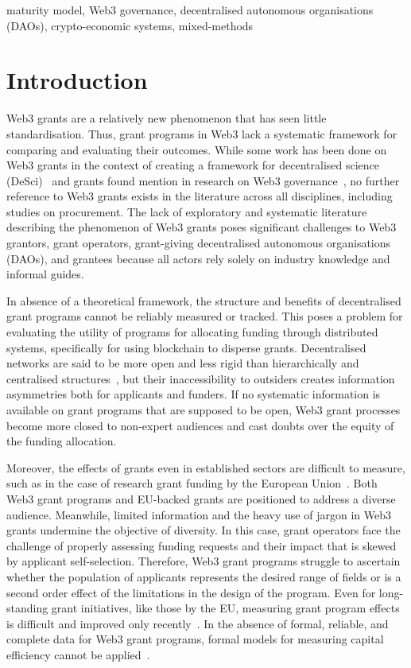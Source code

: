 \documentclass[conference]{IEEEtran}
\begin{document}
\begin{IEEEkeywords}
maturity model, Web3 governance, decentralised autonomous organisations (DAOs), crypto-economic systems, mixed-methods
\end{IEEEkeywords}

\section{Introduction}\label{sec_1}
Web3 grants are a relatively new phenomenon that has seen little standardisation. Thus, grant programs in Web3 lack a systematic framework for comparing and evaluating their outcomes. While some work has been done on Web3 grants in the context of creating a framework for decentralised science (DeSci)~\cite{ding_desci_2022} and grants found mention in research on Web3 governance~\cite{allen_exchange_2022}, no further reference to Web3 grants exists in the literature across all disciplines, including studies on procurement. The lack of exploratory and systematic literature describing the phenomenon of Web3 grants poses significant challenges to Web3 grantors, grant operators, grant-giving decentralised autonomous organisations (DAOs), and grantees because all actors rely solely on industry knowledge and informal guides.

In absence of a theoretical framework, the structure and benefits of decentralised grant programs cannot be reliably measured or tracked. This poses a problem for evaluating the utility of programs for allocating funding through distributed systems, specifically for using blockchain to disperse grants. Decentralised networks are said to be more open and less rigid than hierarchically and centralised structures~\cite{ding_desci_2022}, but their inaccessibility to outsiders creates information asymmetries both for applicants and funders. If no systematic information is available on grant programs that are supposed to be open, Web3 grant processes become more closed to non-expert audiences and cast doubts over the equity of the funding allocation.

Moreover, the effects of grants even in established sectors are difficult to measure, such as in the case of research grant funding by the European Union~\cite{selebaj_effects_2021}. Both Web3 grant programs and EU-backed grants are positioned to address a diverse audience. Meanwhile, limited information and the heavy use of jargon in Web3 grants undermine the objective of diversity. In this case, grant operators face the challenge of properly assessing funding requests and their impact that is skewed by applicant self-selection. Therefore, Web3 grant programs struggle to ascertain whether the population of applicants represents the desired range of fields or is a second order effect of the limitations in the design of the program. Even for long-standing grant initiatives, like those by the EU, measuring grant program effects is difficult and improved only recently~\cite{selebaj_effects_2021}. In the absence of formal, reliable, and complete data for Web3 grant programs, formal models for measuring capital efficiency cannot be applied~\cite{ odewole_capital_2020}.
\end{document}
